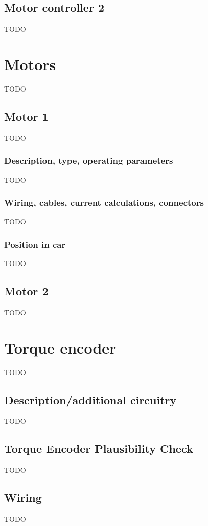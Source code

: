 \documentclass{article}
\begin{document}
\subsection{Motor controller 2}
TODO

\section{Motors}
TODO

\subsection{Motor 1}
TODO

\subsubsection{Description, type, operating parameters}
TODO

\subsubsection{Wiring, cables, current calculations, connectors}
TODO

\subsubsection{Position in car}
TODO

\subsection{Motor 2}
TODO

\section{Torque encoder}
TODO

\subsection{Description/additional circuitry}
TODO

\subsection{Torque Encoder Plausibility Check}
TODO

\subsection{Wiring}
TODO
\end{document}
